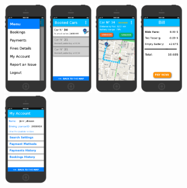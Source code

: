 \documentclass[11pt]{article} %
\begin{document}
\begin{figure}[H]
	\includegraphics[width=0.2\textwidth]{mockup/11Menu.png}
	\includegraphics[width=0.2\textwidth]{mockup/5CarBookedList.png}
	\includegraphics[width=0.2\textwidth]{mockup/6CarBookedSelected.png}
	\includegraphics[width=0.2\textwidth]{mockup/8Bill.png} 	\hspace{0.8cm}
	\includegraphics[width=0.2\textwidth]{mockup/9MyAccount.png} 	\hspace{0.8cm}

\end{figure}
\end{document}
